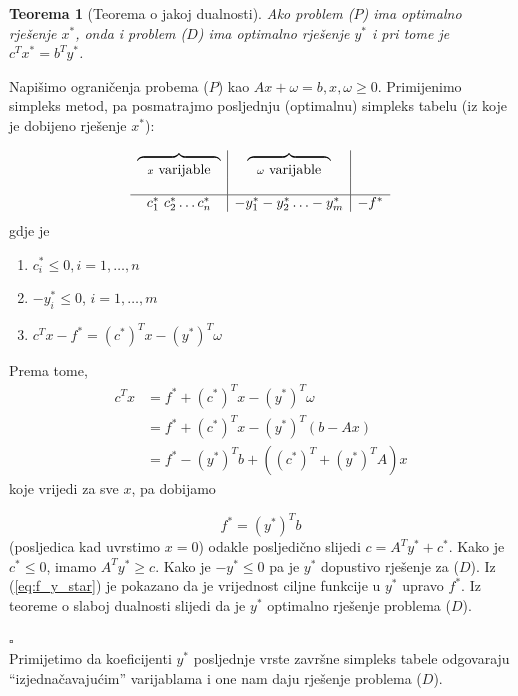 \documentclass[a4paper, utf8, 11pt, colorlinks]{book}
\newtheorem{thm}{Teorema}
\newenvironment{proof}{{Dokaz:}}{\hfill$\square$}
\begin{document}
\begin{thm}[Teorema o jakoj dualnosti]
     Ako problem ($P$) ima optimalno rješenje $x^*$, onda i problem ($D$) ima optimalno rješenje $y^*$ i pri tome je $c^T x^* = b^T y^*$.
\end{thm}
\begin{proof}
         Napišimo ograničenja probema ($P$) kao $Ax + \omega = b, x, \omega \geq 0$.
         Primijenimo simpleks metod, pa posmatrajmo posljednju (optimalnu) simpleks tabelu (iz koje je dobijeno rješenje $x^*$):
         
         $$\begin{array}{c |c | c}
         \overbrace{\ \ \ \ \ \hspace{1.5cm}}_{x \mbox{ varijable}}     &  \overbrace{\ \ \ \ \ \hspace{1.5cm}}_{\omega \mbox{ varijable}} &   \\
                                                           & &   \\
         \hline
             c_1^*\ c_2^* \ldots c_n^*            & -y_1^* -y_2^* \ldots -y_m^*  & -f^*
         \end{array}
         $$
   gdje je 
   \begin{enumerate}
       \item    $c^*_i \leq 0, i = 1,\ldots, n$ 
       \item    $-y_i^* \leq 0$, $i = 1,\ldots, m$
       \item  $c^T x - f^* = (c^*)^T x - (y^*)^T \omega$
    \end{enumerate}
    Prema tome, 
    \begin{align*}
           c^T x &=  f^* + (c^*)^T x - (y^*)^T \omega \\
                 &=  f^* + (c^*)^T x - (y^*)^T (b - Ax) \\
                 &= f^*  - (y^*)^T b +   ((c^*)^T + (y^*)^T A ) x
    \end{align*}
    koje vrijedi za sve $x$, pa dobijamo 
    
    \begin{equation}\label{eq:f_y_star}
        f^* = (y^*)^T b
    \end{equation}
     (posljedica kad uvrstimo $x = 0$) odakle posljedično slijedi 
    $ c = A^T y^* + c^*$. 
    Kako je $c^* \leq 0$, imamo  $A^T y^* \geq c$. Kako je $-y^* \leq 0$ pa je $y^*$ dopustivo rješenje za  ($D$).  Iz (\ref{eq:f_y_star}) je pokazano da je vrijednost ciljne funkcije u $y^*$ upravo $f^*$. Iz teoreme o slaboj dualnosti slijedi da je $y^*$ optimalno rješenje problema  ($D$). 
    
\end{proof} \\
Primijetimo da koeficijenti $y^*$ posljednje vrste završne simpleks tabele odgovaraju  ``izjednačavajućim''   varijablama i one nam daju rješenje problema  ($D$).  
\end{document}
